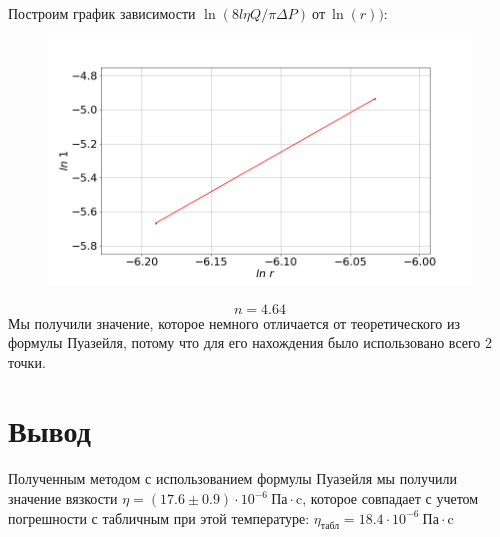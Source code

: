\documentclass[a4paper, fontsize=14pt]{article}
\begin{document}
Построим график зависимости $\ln(8l\eta Q/\pi \Delta P)\ \text{от}\ \ln(r))$:
\begin{figure}[H]
\center
\includegraphics[scale=0.4]{result.png}
\end{figure}

\[
	n = 4.64
\]
Мы получили значение, которое немного отличается от теоретического из формулы Пуазейля, потому что для его нахождения было использовано всего 2 точки.
\newpage
\section*{Вывод}
Полученным методом с использованием формулы Пуазейля мы получили значение вязкости $\eta =  (17.6 \pm 0.9) \cdot 10^{-6}\ \text{Па} \cdot \text{c}$, которое совпадает с учетом погрешности с табличным при этой температуре: $\eta_\text{табл} = 18.4 \cdot 10^{-6} \ \text{Па} \cdot \text{c}$
\end{document}
